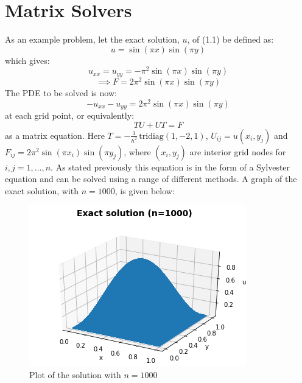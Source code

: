 \documentclass{article}
\numberwithin{equation}{section}
\begin{document}
\section{Matrix Solvers}
As an example problem, let the exact solution, $u$, of (1.1) be defined as:
\begin{equation} 
u = \sin{(\pi x)} \sin{(\pi y)}
\end{equation}
which gives:
\begin{equation} 
u_{xx} = u_{yy} = - \pi^2 \sin{(\pi x)} \sin{(\pi y)}
\end{equation}
\begin{equation}
\implies F = 2 \pi^2 \sin{(\pi x)} \sin {(\pi y)}
\end{equation}
The PDE to be solved is now:
\begin{equation}
-u_{xx} - u_{yy}  = 2 \pi^2 \sin{(\pi x)} \sin {(\pi y)}
\end{equation}
at each grid point, or equivalently:
	\begin{equation}
	TU + UT = F
	\end{equation}
as a matrix equation. Here $T=-\frac{1}{h^2} \, \text{tridiag}(1,-2,1)$, $U_{ij} = u(x_i, y_j)$ and $F_{ij} = 2 \pi^2 \sin{(\pi x_i)} \sin{(\pi y_j)}$, where $(x_i, y_j)$ are interior grid nodes for $i,j=1,\dots,n$. As stated previously this equation is in the form of a Sylvester equation and can be solved using a range of different methods. A graph of the exact solution, with $n=1000$, is given below:

\begin{figure}[H]
\includegraphics[scale=.7]{img/U_sol.png}
\centering
\caption{Plot of the solution with $n=1000$}
\end{figure} 
\end{document}
